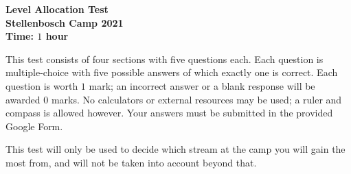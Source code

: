 \documentclass{article}
\begin{document}
\thispagestyle{empty}

\begin{center}
  \textbf{\Large Level Allocation Test}
  \\ \vspace{1em}
  \textbf{\large Stellenbosch Camp 2021}
  \\ \vspace{1em}
  \textbf{\large Time: $1$ hour}
\end{center}

\vspace{24pt}

This test consists of four sections with five questions each.
Each question is multiple-choice with five possible answers of which exactly one is correct.
Each question is worth $1$ mark; an incorrect answer or a blank response will be awarded $0$ marks.
No calculators or external resources may be used; a ruler and compass is allowed however.
Your answers must be submitted in the provided Google Form.

This test will only be used to decide which stream at the camp you will gain the most from, and will not be taken into account beyond that.
\end{document}
